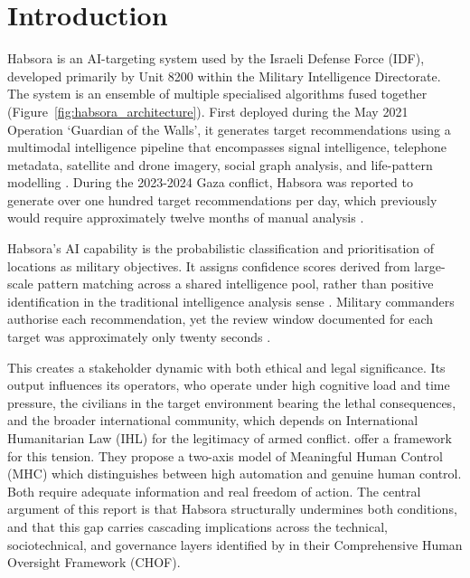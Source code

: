 \section{Introduction}
\label{sec:introduction}

Habsora is an AI-targeting system used by the Israeli Defense Force (IDF), developed primarily by Unit 8200 within the Military Intelligence Directorate. The system is an ensemble of multiple specialised algorithms fused together \citep{dwoskin_2024} (Figure~\ref{fig:habsora_architecture}). First deployed during the May 2021 Operation `Guardian of the Walls', it generates target recommendations using a multimodal intelligence pipeline that encompasses signal intelligence, telephone metadata, satellite and drone imagery, social graph analysis, and life-pattern modelling \citep{abraham_2024, dwoskin_2024}. During the 2023-2024 Gaza conflict, Habsora was reported to generate over one hundred target recommendations per day, which previously would require approximately twelve months of manual analysis \citep{abraham_2024, ynet_2024}.

Habsora's AI capability is the probabilistic classification and prioritisation of locations as military objectives. It assigns confidence scores derived from large-scale pattern matching across a shared intelligence pool, rather than positive identification in the traditional intelligence analysis sense \citep{ootlaws}. Military commanders authorise each recommendation, yet the review window documented for each target was approximately only twenty seconds \citep{abraham_2024}.

This creates a stakeholder dynamic with both ethical and legal significance. Its output influences its operators, who operate under high cognitive load and time pressure, the civilians in the target environment bearing the lethal consequences, and the broader international community, which depends on International Humanitarian Law (IHL) for the legitimacy of armed conflict. \citet{mhcof} offer a framework for this tension. They propose a two-axis model of Meaningful Human Control (MHC) which distinguishes between high automation and genuine human control. Both require adequate information and real freedom of action. The central argument of this report is that Habsora structurally undermines both conditions, and that this gap carries cascading implications across the technical, sociotechnical, and governance layers identified by \citet{info12090385} in their Comprehensive Human Oversight Framework (CHOF).